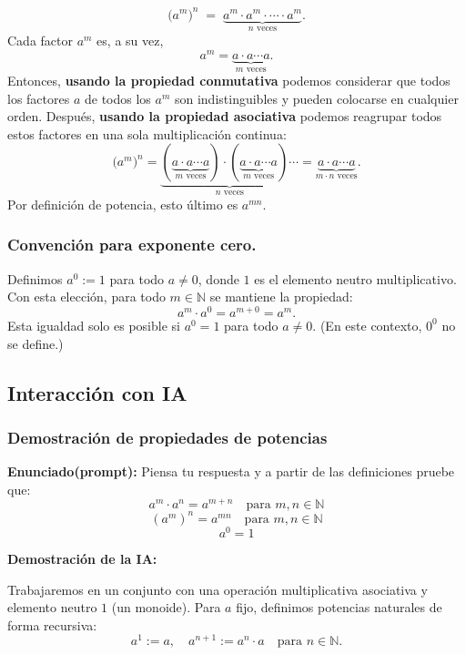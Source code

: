 \documentclass{article}
\begin{document}
\[
\bigl(a^m\bigr)^n
\;=\;
\underbrace{a^m \cdot a^m \cdot \dotsb \cdot a^m}_{n \text{ veces}}.
\]
Cada factor $a^m$ es, a su vez,
\[
a^m = \underbrace{a \cdot a \cdots a}_{m \text{ veces}}.
\]
Entonces, \textbf{usando la propiedad conmutativa} podemos considerar que todos los factores $a$ de todos los $a^m$ son indistinguibles y pueden colocarse en cualquier orden.  
Después, \textbf{usando la propiedad asociativa} podemos reagrupar todos estos factores en una sola multiplicación continua:
\[
\bigl(a^m\bigr)^n
= 
\underbrace{
\left( \underbrace{a \cdot a \cdots a}_{m \text{ veces}} \right)
\cdot
\left( \underbrace{a \cdot a \cdots a}_{m \text{ veces}} \right)
\cdots
}_{n \text{ veces}}
= 
\underbrace{a \cdot a \cdots a}_{m \cdot n \text{ veces}}.
\]
Por definición de potencia, esto último es $a^{mn}$.

\qedhere

\medskip
\subsubsection{Convención para exponente cero.}
Definimos $a^0:=1$ para todo $a\neq 0$, donde $1$ es el elemento neutro multiplicativo.  
Con esta elección, para todo $m\in\mathbb{N}$ se mantiene la propiedad:
\[
a^m \cdot a^0 = a^{m+0} = a^m.
\]
Esta igualdad solo es posible si $a^0 = 1$ para todo $a \neq 0$.  
(En este contexto, $0^0$ no se define.)

\subsection{Interacción con IA}

\subsubsection{Demostración de propiedades de potencias}

\textbf{Enunciado(prompt):}  
Piensa tu respuesta y a partir de las definiciones pruebe que:
\[
a^m \cdot a^n = a^{m+n} \quad \text{para } m,n \in \mathbb{N}
\]
\[
(a^m)^n = a^{mn} \quad \text{para } m,n \in \mathbb{N}
\]
\[
a^0 = 1
\]

\bigskip

\textbf{Demostración de la IA:}  

Trabajaremos en un conjunto con una operación multiplicativa asociativa y elemento neutro \(1\) (un monoide).  
Para \(a\) fijo, definimos potencias naturales de forma recursiva:
\[
a^1 := a, \quad a^{n+1} := a^n \cdot a \quad \text{para } n \in \mathbb{N}.
\]
\end{document}
